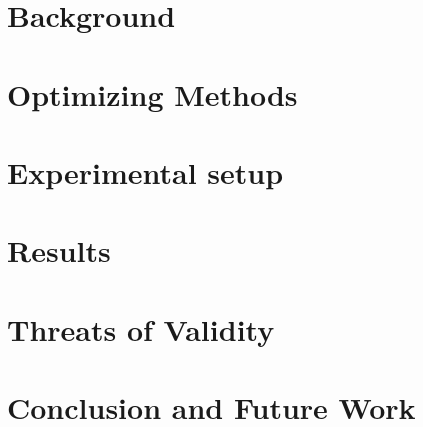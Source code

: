 \documentclass[conference,10pt]{IEEEtran}
\begin{document}
\section{Background}
\label{sec:background}



\section{Optimizing Methods}
\label{sec:method}




\section{Experimental setup}
\label{sec:experiments}





\section{Results}
\label{sec:results}



\section{Threats of Validity}
\label{sec:threats}





\section{Conclusion and Future Work}
\label{sec:conclusion}

% 

\balance


\end{document}
